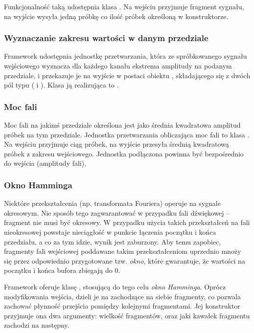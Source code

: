 Funkcjonalność taką udostępnia klasa . Na wejściu przyjmuje fragment sygnału, na
wyjście wysyła jedną próbkę co ilość próbek określoną w konstruktorze.

\subsubsection{Wyznaczanie zakresu wartości w danym przedziale}

Framework udostępnia jednostkę przetwarzania, która ze spróbkowanego sygnału wejściowego wyznacza
dla każdego kanału ekstrema amplitudy na podanym przedziale, i przekazuje je na wyjście w postaci
obiektu , składającego się z dwóch pól typu  ( i ).
Klasa ją realizująca to .

\subsubsection{Moc fali}

Moc fali na jakimś przedziale określona jest jako średnia kwadratowa amplitud próbek na tym
przedziale. Jednostka przetwarzania obliczająca moc fali to klasa . Na wejściu przyjmuje
ciąg próbek, na wyjście przesyła średnią kwadratową próbek z zakresu wejściowego.  Jednostka
podłączona powinna być bezpośrednio do wejścia (amplitudy fali).

\subsubsection{Okno Hamminga}

Niektóre przekształcenia (np. transformata Fouriera) operuje na sygnale okresowym. Nie sposób tego
zagwarantować w przypadku fali dźwiękowej -- fragment nie musi być okresowy. W przypadku użycia
takich przekształceń na fali nieokresowej powstaje nieciągłość w punkcie łączenia początku i końca
przedziału, a co za tym idzie, wynik jest zaburzony. Aby temu zapobiec, fragmenty fali wejściowej
poddawane takim przekształceniom uprzednio mnoży się przez odpowiednio przygotowane tzw.
\emph{okno}, które gwarantuje, że wartości na początku i końca bufora zbiegają do 0.

Framework oferuje klasę , stosującą do tego celu \emph{okno Hamminga}.
Oprócz modyfikowania wejścia, dzieli je na zachodzące na siebie fragmenty, co pozwala zachować
płynność przejścia pomiędzy kolejnymi fragmentami. Jej konstruktor przyjmuje ona dwa argumenty:
wielkość fragmentów, oraz jaki kawałek fragmentu zachodzi na następny.

